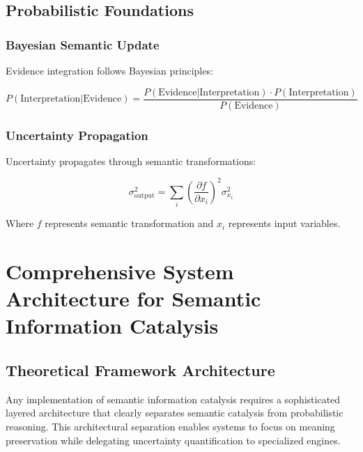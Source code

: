 \documentclass[12pt,a4paper,twoside]{article}
\begin{document}
\subsection{Probabilistic Foundations}

\subsubsection{Bayesian Semantic Update}

Evidence integration follows Bayesian principles:

\begin{equation}
P(\text{Interpretation}|\text{Evidence}) = \frac{P(\text{Evidence}|\text{Interpretation}) \cdot P(\text{Interpretation})}{P(\text{Evidence})}
\end{equation}

\subsubsection{Uncertainty Propagation}

Uncertainty propagates through semantic transformations:

\begin{equation}
\sigma_{\text{output}}^2 = \sum_{i} \left(\frac{\partial f}{\partial x_i}\right)^2 \sigma_{x_i}^2
\end{equation}

Where $f$ represents semantic transformation and $x_i$ represents input variables.

\section{Comprehensive System Architecture for Semantic Information Catalysis}

\subsection{Theoretical Framework Architecture}

Any implementation of semantic information catalysis requires a sophisticated layered architecture that clearly separates semantic catalysis from probabilistic reasoning. This architectural separation enables systems to focus on meaning preservation while delegating uncertainty quantification to specialized engines.
\end{document}
